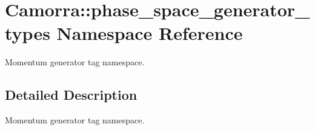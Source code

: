 \hypertarget{a00807}{
\section{Camorra::phase\_\-space\_\-generator\_\-types Namespace Reference}
\label{a00807}
}


Momentum generator tag namespace.  




\subsection{Detailed Description}
Momentum generator tag namespace. 
